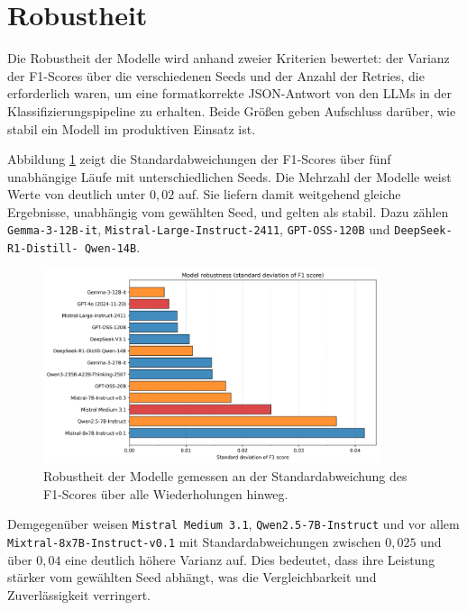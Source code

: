\section{Robustheit}\label{sec:robustheit}

Die Robustheit der Modelle wird anhand zweier Kriterien bewertet: der Varianz der F1-Scores über die verschiedenen Seeds und der Anzahl der Retries, die erforderlich waren, um eine formatkorrekte JSON-Antwort von den \acp{LLM} in der Klassifizierungspipeline zu erhalten. Beide Größen geben Aufschluss darüber, wie stabil ein Modell im produktiven Einsatz ist.

Abbildung \ref{fig:results-evaluation-robustness-f1-std} zeigt die Standardabweichungen der F1‑Scores über fünf unabhängige Läufe mit unterschiedlichen Seeds. Die Mehrzahl der Modelle weist Werte von deutlich unter $0{,}02$ auf. Sie liefern damit weitgehend gleiche Ergebnisse, unabhängig vom gewählten Seed, und gelten als stabil. Dazu zählen \texttt{Gemma-3-12B-it}, \texttt{Mistral-Large-Instruct-2411}, \texttt{GPT-OSS-120B} und \texttt{DeepSeek-R1-Distill-\linebreak~Qwen-14B}.

\begin{figure}[h]
    \centering
    \includegraphics[width=0.88\textwidth]{images/results/evaluation_robustness_f1_std_en}
    \caption{Robustheit der Modelle gemessen an der Standardabweichung des F1-Scores über alle Wiederholungen hinweg.}
    \label{fig:results-evaluation-robustness-f1-std}
\end{figure}

Demgegenüber weisen \texttt{Mistral Medium 3.1}, \texttt{Qwen2.5-7B-Instruct} und vor allem \texttt{Mixtral-8x7B-Instruct-v0.1} mit Standardabweichungen zwischen $0{,}025$ und über $0{,}04$ eine deutlich höhere Varianz auf. Dies bedeutet, dass ihre Leistung stärker vom gewählten Seed abhängt, was die Vergleichbarkeit und Zuverlässigkeit verringert.

